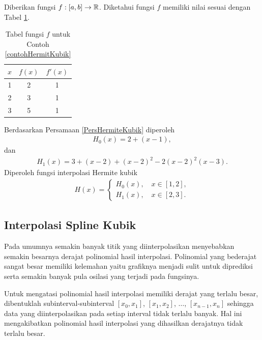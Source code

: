\begin{contoh}\label{contohHermitKubik}
    Diberikan fungsi $f:[a,b] \to \mathbb{R}$. Diketahui fungsi $f$ memiliki nilai sesuai dengan Tabel \ref{tabelfungsi}.
    \begin{table}[htp]
        \centering
        \begin{tabular}{|c|c|c|}
    \hline $x$&$f(x)$&$f'(x)$ \\ 
    \hline
        1 & 2& 1 \\
        2 &3&1\\
        3 &5&1\\
    \hline
    \end{tabular}
        \caption{Tabel fungsi $f$ untuk Contoh \ref{contohHermitKubik}}
        \label{tabelfungsi}
    \end{table}
    Berdasarkan Persamaan \eqref{PersHermiteKubik} diperoleh
    \begin{align*}
        H_0(x) = 2 + (x - 1),
    \end{align*}
    dan
    \begin{align*}
        H_1(x) = 3 + (x - 2) + (x-2)^2 - 2(x-2)^2(x-3).
    \end{align*}
    Diperoleh fungsi interpolasi Hermite kubik
    \begin{align*}
        H(x) =
        \begin{cases}
            H_0(x), \quad x \in [1,2],\\
            H_1(x), \quad x \in [2,3].
        \end{cases}
    \end{align*}
\end{contoh}

\subsection{Interpolasi Spline Kubik}
Pada umumnya semakin banyak titik yang diinterpolasikan menyebabkan semakin besarnya derajat polinomial hasil interpolasi. Polinomial yang bederajat sangat besar memiliki kelemahan yaitu grafiknya menjadi sulit untuk diprediksi serta semakin banyak pula osilasi yang terjadi pada fungsinya.

Untuk mengatasi polinomial hasil interpolasi memiliki derajat yang terlalu besar, dibentuklah subinterval-subinterval $[x_0,x_1]$, $[x_1,x_2]$, $\dots$, $[x_{n-1},x_n]$ sehingga data yang diinterpolasikan pada setiap interval tidak terlalu banyak. Hal ini mengakibatkan polinomial hasil interpolasi yang dihasilkan derajatnya tidak terlalu besar.

